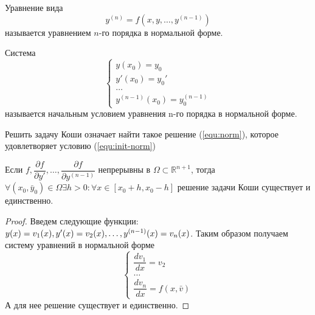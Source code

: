 \begin{definition}
	Уравнение вида
	\begin{equation}
		\label{equ:norm}
		y^{(n)} = f(x, y, \dots, y^{(n-1)})
	\end{equation}
	называется уравнением $n$-го порядка в нормальной форме.
\end{definition}

\begin{definition}
	Система
	\begin{equation}
		\label{equ:init-norm}
		\begin{cases*}
			y(x_0) = y_0\\
			y'(x_0) = y_0'\\
			\dots \\
			y^{(n-1)}(x_0) = y^{(n-1)}_0
		\end{cases*}
	\end{equation}
	называется начальным условием уравнения n-го порядка в нормальной форме.
\end{definition}

\begin{proposition}
	Решить задачу Коши означает найти такое решение (\ref{equ:norm}), которое удовлетворяет условию (\ref{equ:init-norm})
\end{proposition}

\begin{theorem}
	Если $f, \dfrac{\partial f}{\partial y'}, \dots, \dfrac{\partial f}{\partial y^{(n-1)}}$ непрерывны в $\Omega \subset \mathbb{R}^{n+1}$, тогда $\forall (x_0, \bar{y}_0) \in \Omega \exists h > 0: \forall x\in [x_0 +h, x_0-h]$ решение задачи Коши существует и единственно.
\end{theorem}

\begin{proof}
	Введем следующие функции: $y(x) = v_1(x), y'(x) = v_2(x), \dots, y^{(n-1)}(x) \hm= v_n(x)$. Таким образом получаем систему уравнений в нормальной форме
	\begin{equation}
		\begin{cases*}
			\dfrac{dv_1}{dx} = v_2\\
			\dots\\
			\dfrac{dv_n}{dx} = f(x, \bar{v})
		\end{cases*}
	\end{equation}
	А для нее решение существует и единственно.
\end{proof}
